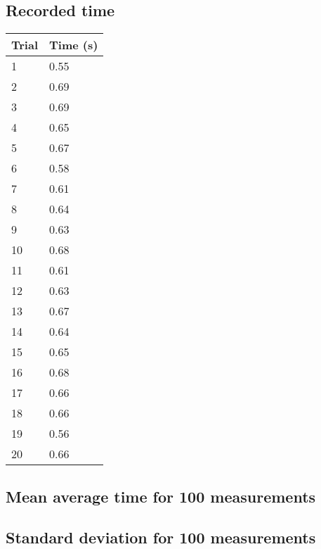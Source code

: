 \documentclass[11pt, letterpaper, includehead]{article}
\begin{document}
  \subsection{Recorded time} %
    \begin{tabular}[H]{| m{2cm} | m{2cm} |}
      \hline
      \textbf{Trial} & \textbf{Time (s)} \\ [0.5ex]
      \hline \hline
        1 & 0.55 \\ 
         \hline
        2 & 0.69 \\ 
         \hline
        3 & 0.69 \\ 
         \hline
        4 & 0.65 \\ 
         \hline
        5 & 0.67 \\ 
         \hline
        6 & 0.58 \\ 
         \hline
        7 & 0.61 \\ 
         \hline
        8 & 0.64 \\ 
         \hline
        9 & 0.63 \\ 
         \hline
        10 & 0.68 \\ 
         \hline
        11 & 0.61 \\ 
         \hline
        12 & 0.63 \\ 
         \hline
        13 & 0.67 \\ 
         \hline
        14 & 0.64 \\ 
         \hline
        15 & 0.65 \\ 
         \hline
        16 & 0.68 \\ 
         \hline
        17 & 0.66 \\ 
         \hline
        18 & 0.66 \\ 
         \hline
        19 & 0.56 \\ 
         \hline
        20 & 0.66 \\ 
         \hline
  \end{tabular} 
 
  \setcounter{subsection}{3} %
  \subsection{Mean average time for 100 measurements} %

  \subsection{Standard deviation for 100 measurements} %
\end{document}
